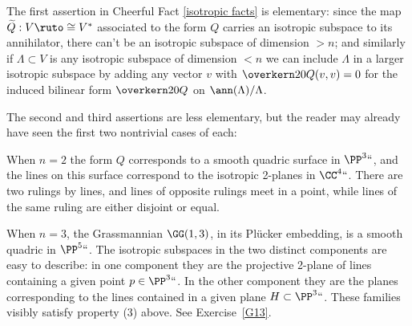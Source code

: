 \begin{remark}
The first assertion in
Cheerful Fact \ref{isotropic facts}
is
elementary: since the map
$\widetilde Q : V \ruto \cong V^*$ associated to the form $Q$ carries
%
an isotropic subspace to its annihilator, there can't be an isotropic
subspace of dimension $>n$; and similarly if $\Lambda \subset V$ is any
isotropic subspace of dimension $<n$ we can include $\Lambda$ in a larger
isotropic subspace by adding any vector $v$ with $\overkern20 Q(v,v) = 0$
for the induced bilinear form $\overkern20 Q$ on $\ann(\Lambda)/\Lambda$.

The second and third assertions are less elementary, but the reader may
already have seen the first two nontrivial cases of each:
\end{remark}

\begin{example}
When $n=2$ the form $Q$ corresponds to a smooth quadric surface
in $\PP^3` `$, and the lines on this surface correspond to the isotropic
2-planes in $\CC^4` `$. There are two rulings by lines, and lines of
opposite rulings meet in a point, while lines of the same ruling are
either disjoint or equal.
\end{example}

\begin{example}
When $n=3$, the Grassmannian $\GG(1,3)$, in its
Pl\"ucker embedding,
%
%
is a smooth quadric in $\PP^5` `$. The isotropic subspaces in the two distinct
components are easy to describe: in one component they are the projective
2-plane of lines containing a given point $p \in \PP^3` `$. In the other
component they are  the planes corresponding to the lines contained in a
given plane $H \subset \PP^3` `$. These families visibly satisfy property (3) above.
See Exercise~\ref{G13}.
\end{example}

